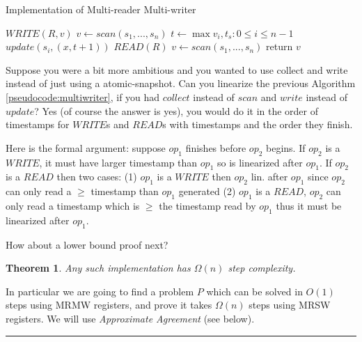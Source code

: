 \documentclass[twoside]{article}
\newcounter{lecnum}
\newtheorem{theorem}{Theorem}[lecnum]
\newenvironment{proof}{{\bf Proof:}}{\hfill\rule{2mm}{2mm}}
\begin{document}
\begin{algorithm}
	\caption{Implementation of Multi-reader Multi-writer}
    \label{pseudocode:multiwriter}
    \begin{algorithmic}[1]
	\State $WRITE(R, v)$
	\State $v \leftarrow scan(s_1, ..., s_n)$
	\State $t \leftarrow \max{v_i, t_s: 0 \leq i \leq n-1}$
	\State $update(s_i, (x, t+1))$
	\State
	\State $READ(R)$
	\State $v \leftarrow scan(s_1, ..., s_n)$
	\State return $v$
	\end{algorithmic}
\end{algorithm}

Suppose you were a bit more ambitious and you wanted to use collect and write instead of just using a atomic-snapshot. Can you linearize the previous Algorithm \ref{pseudocode:multiwriter}, if you had $collect$ instead of $scan$ and $write$ instead of $update$? Yes (of course the answer is yes), you would do it in the order of timestamps for $WRITE$s and $READ$s with timestamps and the order they finish. 

Here is the formal argument: suppose $op_1$ finishes before $op_2$ begins. If $op_2$ is a $WRITE$, it must have larger timestamp than $op_1$ so is linearized after $op_1$. If $op_2$ is a $READ$ then two cases: (1) $op_1$ is a $WRITE$ then $op_2$ lin. after $op_1$ since $op_2$ can only read a $\geq$ timestamp than $op_1$ generated (2) $op_1$ is a $READ$, $op_2$ can only read a timestamp which is $\geq$ the timestamp read by $op_1$ thus it must be linearized after $op_1$.

How about a lower bound proof next?
\begin{theorem}
Any such implementation has $\Omega(n)$ step complexity.
\end{theorem}
\begin{proof}
In particular we are going to find a problem $P$ which can be solved in $O(1)$ steps using MRMW registers, and prove it takes $\Omega(n)$ steps using MRSW registers. We will use \emph{Approximate Agreement} (see below).
\end{proof}
\end{document}
